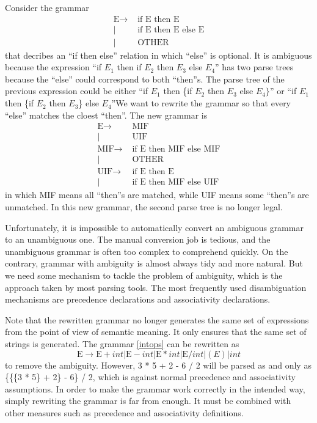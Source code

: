 Consider the grammar
\begin{equation}
\begin{split}
\text{E}\rightarrow &\text{ if E then E}\\
|&\text{ if E then E else E}\\
|&\text{ OTHER}
\end{split}
\end{equation}
that decribes an ``if then else'' relation in which ``else'' is optional. It is ambiguous because the expression 
``if $E_1$ then if $E_2$ then $E_3$ else $E_4$'' has two parse trees because the ``else'' could correspond to both ``then''s. The parse tree of the previous expression could be either ``if $E_1$ then \{if $E_2$ then $E_3$ else $E_4\}$'' or ``if $E_1$ then \{if $E_2$ then $E_3$\} else $E_4$''We want to rewrite the grammar so that every ``else'' matches the cloest ``then''. The new grammar is
\begin{equation}
\begin{split}
\text{E}\rightarrow &\text{ MIF}\\
|&\text{ UIF}\\
\text{MIF}\rightarrow &\text{ if E then MIF else MIF}\\
|&\text{ OTHER}\\
\text{UIF}\rightarrow &\text{ if E then E}\\
|&\text{ if E then MIF else UIF}
\end{split}
\end{equation}
in which MIF means all ``then''s are matched, while UIF means some ``then''s are unmatched. In this new grammar, the second parse tree is no longer legal.

Unfortunately, it is impossible to automatically convert an ambiguous grammar to an unambiguous one. The manual conversion job is tedious, and the unambiguous grammar is often too complex to comprehend quickly. On the contrary, grammar with ambiguity is almost always tidy and more natural. But we need some mechanism to tackle the problem of ambiguity, which is the approach taken by most parsing tools. The most frequently used disambiguation mechanisms are precedence declarations and associativity declarations.

Note that the rewritten grammar no longer generates the same set of expressions from the point of view of semantic meaning. It only ensures that the same set of strings is generated. The grammar \eqref{intops} can be rewritten as 
\begin{equation}
\text{E}\rightarrow \text{E} + int |\text{E} - int | \text{E} * int |\text{E} / int | (E) | int
\end{equation}
to remove the ambiguity. However, 3 * 5 + 2 - 6 / 2 will be parsed as and only as \{\{\{3 * 5\} + 2\} - 6\} / 2, which is against normal precedence and associativity assumptions. In order to make the grammar work correctly in the intended way, simply rewriting the grammar is far from enough. It must be combined with other measures such as precedence and associativity definitions. 

